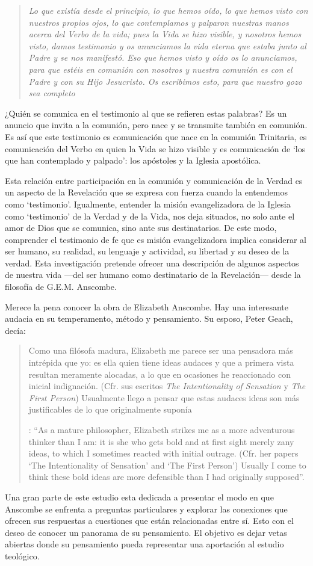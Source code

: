 \blockquote[][\,(1 Jn 1-4)]{\emph{Lo que existía desde el principio, lo que hemos oído, lo que hemos visto con nuestros propios ojos, lo que contemplamos y palparon nuestras manos acerca del Verbo de la vida; pues la Vida se hizo visible, y nosotros hemos visto, damos testimonio y os anunciamos la vida eterna que estaba junto al Padre y se nos manifestó. Eso que hemos visto y oído os lo anunciamos, para que estéis en comunión con nosotros y nuestra comunión es con el Padre y con su Hijo Jesucristo. Os escribimos esto, para que nuestro gozo sea completo}}. ¿Quién se comunica en el testimonio al que se refieren estas palabras? Es un anuncio que invita a la comunión, pero nace y se transmite también en comunión. Es así que este testimonio es comunicación que nace en la comunión Trinitaria, es comunicación del Verbo en quien la Vida se hizo visible y es comunicación de \enquote*{los que han contemplado y palpado}: los apóstoles y la Iglesia apostólica.

Esta relación entre participación en la comunión y comunicación de la Verdad es un aspecto de la Revelación que se expresa con fuerza cuando la entendemos como `testimonio'. Igualmente, entender la misión evangelizadora de la Iglesia como `testimonio' de la Verdad y de la Vida, nos deja situados, no solo ante el amor de Dios que se comunica, sino ante sus destinatarios. De este modo, comprender el testimonio de fe que es misión evangelizadora implica considerar al ser humano, su realidad, su lenguaje y actividad, su libertad y su deseo de la verdad. Esta investigación pretende ofrecer una descripción de algunos aspectos de nuestra vida ---del ser humano como destinatario de la Revelación--- desde la filosofía de G.E.M. Anscombe.

Merece la pena conocer la obra de Elizabeth Anscombe. Hay una interesante audacia en su temperamento, método y pensamiento. Su esposo, Peter Geach, decía: \blockquote[{\Cite[11]{geach1991philaut}}: \enquote{As a mature philosopher, Elizabeth strikes me as a more adventurous thinker than I am: it is she who gets bold and at first sight merely zany ideas, to which I sometimes reacted with initial outrage. (Cfr. her papers `The Intentionality of Sensation' and `The First Person') Usually I come to think these bold ideas are more defensible than I had originally supposed}.]{Como una filósofa madura, Elizabeth me parece ser una pensadora más intrépida que yo: es ella quien tiene ideas audaces y que a primera vista resultan meramente alocadas, a lo que en ocasiones he reaccionado con inicial indignación. (Cfr. sus escritos \emph{The Intentionality of Sensation} y \emph{The First Person}) Usualmente llego a pensar que estas audaces ideas son más justificables de lo que originalmente suponía}. Una gran parte de este estudio esta dedicada a presentar el modo en que Anscombe se enfrenta a preguntas particulares y explorar las conexiones que ofrecen sus respuestas a cuestiones que están relacionadas entre sí. Esto con el deseo de conocer un panorama de su pensamiento. El objetivo es dejar vetas abiertas donde su pensamiento pueda representar una aportación al estudio teológico.

